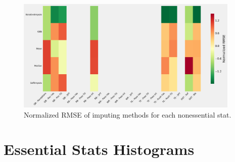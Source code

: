 \documentclass[12pt]{article}
\begin{document}
\begin{figure}[H]
  \centering
  \includegraphics[width=0.95\textwidth]{../figures/nonessential_impute_RMSE}
  \caption{Normalized RMSE of imputing methods for each nonessential stat.}
\end{figure}

\pagebreak
\section{Essential Stats Histograms}
\end{document}
